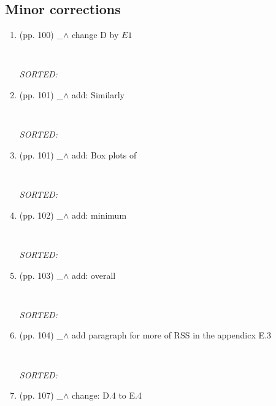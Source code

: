 \documentclass[12pt]{article}
\begin{document}
\subsection{Minor corrections}
\begin{enumerate}

\item  (pp. 100)  \_$\wedge$  
	change D by $E1$
	\begin{verbatim}
	
	\end{verbatim}
	\textit{
	SORTED:  
	}
	\\

\item  (pp. 101)  \_$\wedge$  
	add: Similarly
	\begin{verbatim}
	
	\end{verbatim}
	\textit{
	SORTED:  
	}
	\\

\item  (pp. 101)  \_$\wedge$  
	add: Box plots of
	\begin{verbatim}
	
	\end{verbatim}
	\textit{
	SORTED:  
	}
	\\

\item  (pp. 102)  \_$\wedge$  
	add: minimum
	\begin{verbatim}
	
	\end{verbatim}
	\textit{
	SORTED:  
	}
	\\

\item  (pp. 103)  \_$\wedge$  
	add: overall
	\begin{verbatim}
	
	\end{verbatim}
	\textit{
	SORTED:  
	}
	\\

\item  (pp. 104)  \_$\wedge$  
	add paragraph for more of RSS
	in the appendicx E.3
	\begin{verbatim}
	
	\end{verbatim}
	\textit{
	SORTED:  
	}
	\\

\item  (pp. 107)  \_$\wedge$  
	change: D.4 to E.4
	\begin{verbatim}
	

\end{verbatim}
\end{enumerate}
\end{document}
